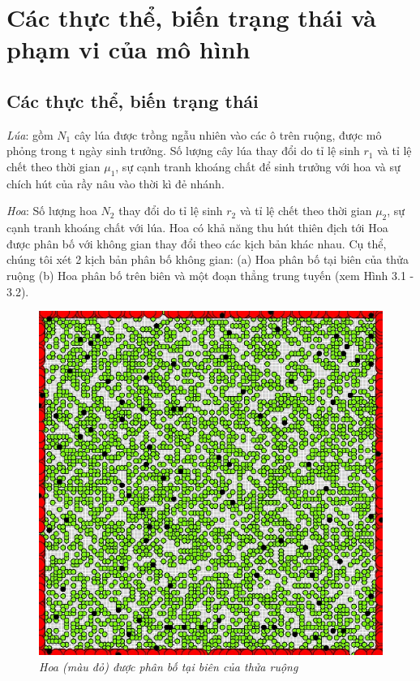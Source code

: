 \documentclass[13pt]{extreport}
\begin{document}
\section{Các thực thể, biến trạng thái và phạm vi của mô hình}
\subsection*{Các thực thể, biến trạng thái}
\textit{\indent Lúa}: gồm $N_1$ cây lúa được trồng ngẫu nhiên vào các ô trên ruộng, được mô phỏng trong t ngày sinh trưởng. Số lượng cây lúa thay đổi do tỉ lệ sinh $r_1$ và tỉ lệ chết theo thời gian  $\mu_1$, sự cạnh tranh khoáng chất để sinh trưởng với hoa và sự chích hút của rầy nâu vào thời kì đẻ nhánh.

\textit{Hoa}: Số lượng hoa $N_2$ thay đổi do tỉ lệ sinh $r_2$ và tỉ lệ chết theo thời gian  $\mu_2$, sự cạnh tranh khoáng chất với lúa. Hoa có khả năng thu hút thiên địch tới Hoa được phân bố với không gian thay đổi theo các kịch bản khác nhau. Cụ thể, chúng tôi xét 2 kịch bản phân bố không gian: (a) Hoa phân bố tại biên của thửa ruộng (b) Hoa phân bố trên biên và một đoạn thẳng trung tuyến (xem Hình 3.1 - 3.2).

\begin{figure}
\begin{center}
\includegraphics[scale=0.4]{kb2}
\end{center}
\caption{\textit{Hoa (màu đỏ) được phân bố tại biên của thửa ruộng}}
\end{figure}
\end{document}
